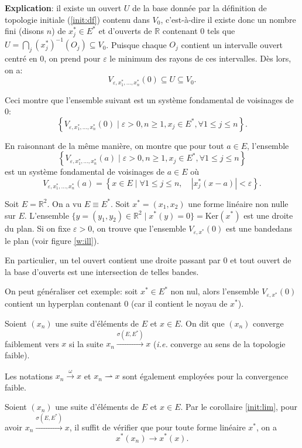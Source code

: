 \textbf{Explication}: il existe un ouvert $U$ de la base
donnée par la définition de topologie initiale (\ref{init:df})
contenu dans $V_0$, c'est-à-dire
il existe donc un nombre fini (disons $n$) de $x_j^*\in E^*$ et d'ouverts de
$\mathbb R$ contenant $0$ tels que
$U=\bigcap_{j}(x_j^*)^{-1}(O_j)\subseteq V_0$.
Puisque chaque $O_j$ contient un intervalle ouvert centré
en $0$,
on prend pour $\varepsilon$ le minimum des rayons de ces intervalles.
Dès lors, on a:
$$V_{\varepsilon, x_1^*, \ldots, x_n^*}(0)\subseteq U \subseteq V_0.$$

Ceci montre que l'ensemble suivant est un système fondamental
de voisinages de $0$:
$$\left\{V_{\varepsilon, x_1^*, \ldots, x_n^*}(0)\mid \varepsilon > 0,
  n\geq 1, x_j\in E^*, \forall 1\leq j\leq n\right\}. $$

En raisonnant de la même manière, on montre que pour tout $a\in E$,
l'ensemble
$$\left\{V_{\varepsilon, x_1^*, \ldots, x_n^*}(a)\mid \varepsilon > 0,
  n\geq 1, x_j\in E^*, \forall 1\leq j\leq n\right\}$$
est un système fondamental de voisinages de $a\in E$
où $$V_{\varepsilon, x_1^*, \ldots, x_n^*}(a) =
   \left\{ x\in E\mid \forall 1\leq j\leq n,\quad
    |x_j^*(x-a)| < \varepsilon\right\}.$$


\begin{ex}
  Soit $E = \mathbb R^2$. On a vu $E \equiv E^*$.
  Soit $x^*=(x_1, x_2)$ une forme linéaire non nulle sur $E$. L'ensemble
  $\{y = (y_1, y_2)\in \mathbb R^2\mid x^*(y)=0\} = \mathrm{Ker}(x^*)$
  est une droite du plan. Si on fixe $\varepsilon > 0$, on trouve
  que l'ensemble $V_{\varepsilon, x^*}(0)$ est une \og bande\fg dans le plan
  (voir figure \ref{w:ill}).

  En particulier, un tel ouvert contient une droite passant par $0$ et
  tout ouvert de la base d'ouverts est une intersection de telles bandes.
\end{ex}

On peut généraliser cet exemple: soit $x^*\in E^*$
non nul, alors l'ensemble $V_{\varepsilon, x^*}(0)$ contient un hyperplan
contenant $0$ (car il contient le noyau de $x^*$).

\begin{df}
  Soient $(x_n)$ une suite d'éléments de $E$ et $x\in E$.
  On dit que $(x_n)$ converge faiblement vers $x$ si la suite
  $x_n\xrightarrow{\sigma(E, E^*)}x$ (\emph{i.e.} converge au sens de la topologie
  faible).

  Les notations $x_n\xrightarrow{\omega}x$ et $x_n\rightharpoonup x$ sont
  également employées pour la convergence faible.
\end{df}
\begin{lem}
  Soient $(x_n)$ une suite d'éléments de $E$ et $x\in E$.
  Par le corollaire \ref{init:lim}, pour avoir
  $x_n\xrightarrow{\sigma(E, E^*)}x$,  il suffit de vérifier que pour
  toute forme linéaire $x^*$, on a $$x^*(x_n)\to x^*(x).$$
\end{lem}

